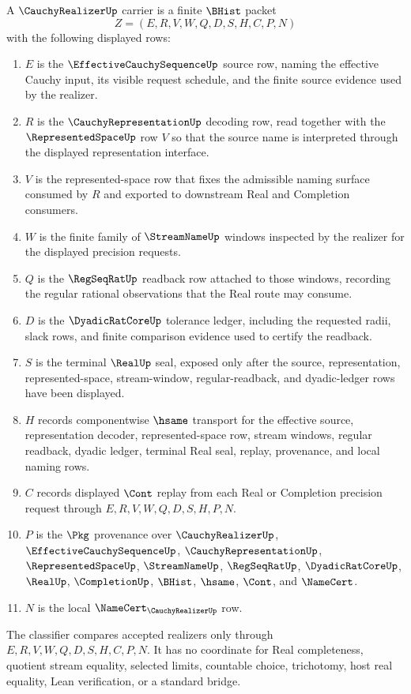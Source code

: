 \begin{definition}
\label{def:cauchy-realizer-carrier}
A $\CauchyRealizerUp$ carrier is a finite $\BHist$ packet
$$
Z=(E,R,V,W,Q,D,S,H,C,P,N)
$$
with the following displayed rows:
\begin{enumerate}
\item $E$ is the $\EffectiveCauchySequenceUp$ source row, naming the effective Cauchy input, its visible request schedule, and the finite source evidence used by the realizer.
\item $R$ is the $\CauchyRepresentationUp$ decoding row, read together with the $\RepresentedSpaceUp$ row $V$ so that the source name is interpreted through the displayed representation interface.
\item $V$ is the represented-space row that fixes the admissible naming surface consumed by $R$ and exported to downstream Real and Completion consumers.
\item $W$ is the finite family of $\StreamNameUp$ windows inspected by the realizer for the displayed precision requests.
\item $Q$ is the $\RegSeqRatUp$ readback row attached to those windows, recording the regular rational observations that the Real route may consume.
\item $D$ is the $\DyadicRatCoreUp$ tolerance ledger, including the requested radii, slack rows, and finite comparison evidence used to certify the readback.
\item $S$ is the terminal $\RealUp$ seal, exposed only after the source, representation, represented-space, stream-window, regular-readback, and dyadic-ledger rows have been displayed.
\item $H$ records componentwise $\hsame$ transport for the effective source, representation decoder, represented-space row, stream windows, regular readback, dyadic ledger, terminal Real seal, replay, provenance, and local naming rows.
\item $C$ records displayed $\Cont$ replay from each Real or Completion precision request through $E,R,V,W,Q,D,S,H,P,N$.
\item $P$ is the $\Pkg$ provenance over $\CauchyRealizerUp$, $\EffectiveCauchySequenceUp$, $\CauchyRepresentationUp$, $\RepresentedSpaceUp$, $\StreamNameUp$, $\RegSeqRatUp$, $\DyadicRatCoreUp$, $\RealUp$, $\CompletionUp$, $\BHist$, $\hsame$, $\Cont$, and $\NameCert$.
\item $N$ is the local $\NameCert_{\CauchyRealizerUp}$ row.
\end{enumerate}
The classifier compares accepted realizers only through $E,R,V,W,Q,D,S,H,C,P,N$. It has no coordinate for Real completeness, quotient stream equality, selected limits, countable choice, trichotomy, host real equality, Lean verification, or a standard bridge.
\end{definition}

